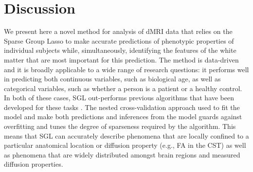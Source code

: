 \documentclass[10pt,letterpaper]{article}
\begin{document}
\begin{figure}[b!]
    \caption{%
    {\bf {}}
    \label{fig:model-performance}
    }
\end{figure}

\section*{Discussion}

We present here a novel method for analysis of dMRI  data that
relies on the Sparse Group Lasso \cite{simon2013sparse} to make accurate
predictions of phenotypic properties of individual subjects while,
simultaneously, identifying the features of the white matter that are most
important for this prediction. The method is data-driven and it is broadly
applicable to a wide range of research questions: it performs well in
predicting both continuous variables, such as biological age, as well as
categorical variables, such as whether a person is a patient or a healthy
control. In both of these cases, SGL out-performs previous algorithms that
have been developed for these tasks \cite{sarica2017corticospinal,
Richard2018-ux, mcpherson2020single}. The nested cross-validation approach
used to fit the model and make both predictions and inferences from the model
guards against overfitting and tunes the degree of sparseness required by the
algorithm. This means that SGL can accurately describe phenomena that are
locally confined to a particular anatomical location or diffusion property
(e.g., FA in the CST) as well as phenomena that are widely distributed
amongst brain regions and measured diffusion properties.
\end{document}
